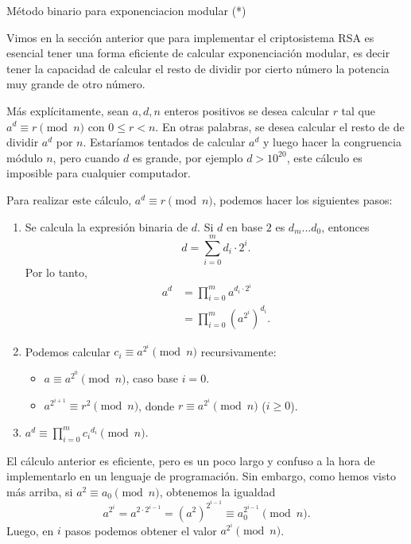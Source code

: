 \begin{section}{Método binario para exponenciacion modular (*)}\label{seccion-exponenciacion-modular}

    Vimos en la sección anterior que para implementar el criptosistema RSA  es esencial tener una forma eficiente de calcular exponenciación modular,  es decir tener la capacidad de calcular el resto de dividir por cierto número la potencia muy grande de otro número. 

    Más explícitamente, sean $a, d, n$ enteros positivos se desea calcular $r$ tal que $a^d \equiv r \pmod{n}$ con  $0 \le r < n$. En  otras palabras,  se desea calcular el resto de de dividir $a^d$ por $n$. Estaríamos tentados de calcular $a^d$ y luego hacer la congruencia módulo $n$, pero cuando $d$ es grande, por ejemplo $d > 10^{20}$, este cálculo es imposible para cualquier computador. 

    Para realizar este cálculo, $a^d \equiv r \pmod{n}$, podemos hacer los siguientes pasos:
    \begin{enumerate}
        \item Se calcula la expresión binaria de $d$. 
        Si $d$ en base $2$ es $d_m...d_0$, entonces
        $$d = \sum_{i=0}^{m} d_i \cdot  2^i.$$
        Por lo tanto, 
        \begin{align*}
        a^d &= \prod_{i=0}^{m} a^{d_i \cdot 2^i} \\ 
                     &= \prod_{i=0}^{m} (a^{2^i})^{d_i}.
        \end{align*}
        \item 
        Podemos calcular $c_i \equiv a^{2^i} \pmod{n}$ recursivamente:
        \begin{itemize}
            \item $a  \equiv a^{2^0} \pmod{n}$, caso base $i =0$. 
            \item $a^{2^{i+1}}  \equiv r^2 \pmod{n}$,  donde $r  \equiv a^{2^i} \pmod{n}$  ($i \ge 0$).
        \end{itemize}
        \item $a^d  \equiv  \prod_{i=0}^{m} {c_i}^{d_i}\pmod{n}$.
    \end{enumerate}

El cálculo anterior es eficiente, pero es un poco largo y confuso a la hora de implementarlo en un lenguaje de programación. 
Sin embargo, como hemos visto más arriba, si $a^2 \equiv a_0 \pmod{n}$, obtenemos la igualdad
$$
a^{2^i} = a^{2\cdot 2^{i-1}} = (a^{2})^{2^{i-1}} \equiv a_0^{2^{i-1}} \pmod{n}.
$$ 
Luego,  en $i$ pasos podemos obtener el valor $a^{2^i} \pmod{n}$.


\end{section}
